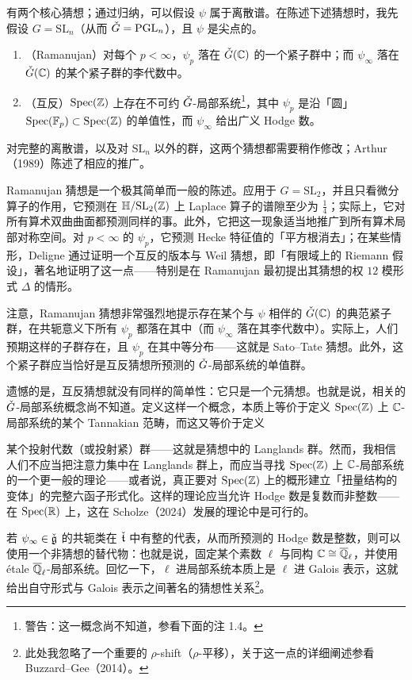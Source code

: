 有两个核心猜想；通过归纳，可以假设 $\psi$ 属于离散谱。在陈述下述猜想时，我先假设 $G=\mathrm{SL}_n$（从而 $\check{G}=\mathrm{PGL}_n$），且 $\psi$ 是尖点的。
\begin{enumerate}
\item （Ramanujan）对每个 $p<\infty$，$\psi_p$ 落在 $\check{G}(\mathbb{C})$ 的一个紧子群中；而 $\psi_\infty$ 落在 $\check{G}(\mathbb{C})$ 的某个紧子群的李代数中。
\item （互反）$\operatorname{Spec}(\mathbb{Z})$ 上存在不可约 $\check{G}$-局部系统\footnote{警告：这一概念尚不知道，参看下面的注 1.4。}，其中 $\psi_p$ 是沿「圆」$\operatorname{Spec}(\mathbb{F}_{p})\subset\operatorname{Spec}(\mathbb{Z})$ 的单值性，而 $\psi_\infty$ 给出广义 Hodge 数。
\end{enumerate}
对完整的离散谱，以及对 $\mathrm{SL}_n$ 以外的群，这两个猜想都需要稍作修改；Arthur（1989）陈述了相应的推广。

\begin{remark}
Ramanujan 猜想是一个极其简单而一般的陈述。应用于 $G=\mathrm{SL}_2$，并且只看微分算子的作用，它预测在 $\mathbb{H}/\mathrm{SL}_2(\mathbb{Z})$ 上 Laplace 算子的谱隙至少为 $\frac14$；实际上，它对所有算术双曲曲面都预测同样的事。此外，它把这一现象适当地推广到所有算术局部对称空间。对 $p<\infty$ 的 $\psi_p$，它预测 Hecke 特征值的「平方根消去」；在某些情形，Deligne 通过证明一个互反的版本与 Weil 猜想，即「有限域上的 Riemann 假设」，著名地证明了这一点——特别是在 Ramanujan 最初提出其猜想的权 $12$ 模形式 $\Delta$ 的情形。

注意，Ramanujan 猜想非常强烈地提示存在某个与 $\psi$ 相伴的 $\check{G}(\mathbb{C})$ 的典范紧子群，在共轭意义下所有 $\psi_p$ 都落在其中（而 $\psi_\infty$ 落在其李代数中）。实际上，人们预期这样的子群存在，且 $\psi_p$ 在其中等分布——这就是 Sato–Tate 猜想。此外，这个紧子群应当恰好是互反猜想所预测的 $\check{G}$-局部系统的单值群。
\end{remark}

\begin{remark}
遗憾的是，互反猜想就没有同样的简单性：它只是一个元猜想。也就是说，相关的 $\check{G}$-局部系统概念尚不知道。定义这样一个概念，本质上等价于定义 $\operatorname{Spec}(\mathbb{Z})$ 上 $\mathbb{C}$-局部系统的某个 Tannakian 范畴，而这又等价于定义

某个投射代数（或投射紧）群——这就是猜想中的 Langlands 群。然而，我相信人们不应当把注意力集中在 Langlands 群上，而应当寻找 $\operatorname{Spec}(\mathbb{Z})$ 上 $\mathbb{C}$-局部系统的一个更一般的理论——或者说，真正要对 $\operatorname{Spec}(\mathbb{Z})$ 上的概形建立「扭量结构的变体」的完整六函子形式化。这样的理论应当允许 Hodge 数是复数而非整数——在 $\operatorname{Spec}(\mathbb{R})$ 上，这在 Scholze（2024）发展的理论中是可行的。

若 $\psi_\infty\in\check{\mathfrak{g}}$ 的共轭类在 $\check{\mathfrak{t}}$ 中有整的代表，从而所预测的 Hodge 数是整数，则可以使用一个非猜想的替代物：也就是说，固定某个素数 $\ell$ 与同构 $\mathbb{C}\cong\overline{\mathbb{Q}}_\ell$，并使用 étale $\overline{\mathbb{Q}}_\ell$-局部系统。回忆一下，$\ell$ 进局部系统本质上是 $\ell$ 进 Galois 表示，这就给出自守形式与 Galois 表示之间著名的猜想性关系\footnote{此处我忽略了一个重要的 $\rho$-shift（$\rho$-平移），关于这一点的详细阐述参看 Buzzard–Gee（2014）。}。
\end{remark}

